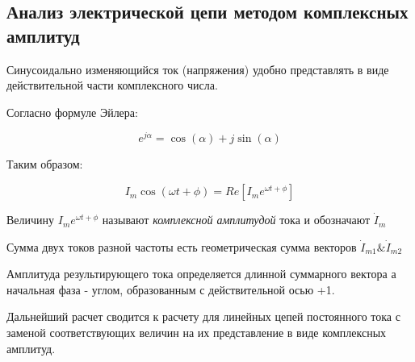 \subsection{Анализ электрической цепи методом комплексных амплитуд}
\label{sec:complex}
Синусоидально изменяющийся ток (напряжения) удобно представлять в виде действительной части комплексного числа.

Согласно формуле Эйлера:

\begin{equation}
e^{j \alpha} = \cos(\alpha) + j \sin(\alpha)
\end{equation}

Таким образом:


\begin{equation}
 I_m \cos (\omega t + \phi ) = Re[I_m e^{\omega t + \phi}]
\end{equation}

Величину $I_m e^{\omega t + \phi}$ называют \textit{комплексной амплитудой } тока и обозначают $\dot I_m$

Сумма двух токов разной частоты есть геометрическая сумма векторов $\dot I_{m1} \& \dot I_{m2}$

Амплитуда результирующего тока определяется длинной суммарного вектора а начальная фаза - углом, образованным с действительной осью +1.

Дальнейший расчет сводится к расчету для линейных цепей постоянного тока с заменой соответствующих величин на их представление в виде комплексных амплитуд.

\pagebreak
